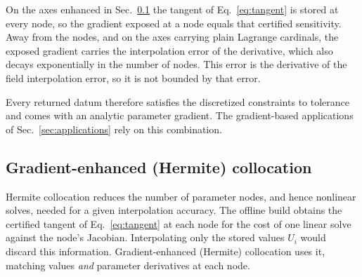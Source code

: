 \documentclass[
  aps,
  prd,
  twocolumn,
  10pt,
  amsmath,
  amssymb,
  nofootinbib,
  superscriptaddress,
  floatfix,
]{revtex4-2}
\begin{document}
On the axes enhanced in Sec.~\ref{sec:param:hermite} the
tangent of Eq.~\eqref{eq:tangent} is stored at every node, so the gradient exposed at
a node equals that certified sensitivity. Away from the nodes, and on the axes
carrying plain Lagrange cardinals, the exposed gradient carries the interpolation error
of the derivative, which also decays exponentially in the number of nodes.
This error is the derivative of the field interpolation error, so it is not bounded by that error.\footnotemark

Every returned datum therefore satisfies the discretized constraints to tolerance and comes with an analytic parameter gradient.
The gradient-based applications of Sec.~\ref{sec:applications} rely on this combination.

\subsection{Gradient-enhanced (Hermite) collocation}
\label{sec:param:hermite}
Hermite collocation reduces the number of parameter nodes, and hence nonlinear solves, needed for a given interpolation accuracy.
The offline build obtains the certified tangent of Eq.~\eqref{eq:tangent} at each node for the cost of one linear solve against the node's Jacobian.
Interpolating only the stored values $U_i$ would discard this information.
Gradient-enhanced (Hermite) collocation uses it, matching values \emph{and} parameter derivatives at each node.
\end{document}
